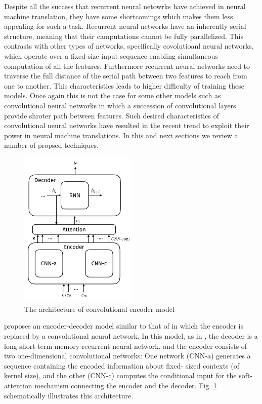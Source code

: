 \documentclass[a4paper]{article}
\begin{document}
Despite all the success that recurrent neural  netowrks  have achieved in neural
machine translation, they have some shortcomings which makes them less appealing
for such a task. Recurrent neural networks have an inherently serial  structure,
meaning that their  camputations  cannot  be  fully parallelized. This contrasts
with  other types of networks, specifically covolutioanl neural  networks, which
operate  over a  fixed-size input sequence enabling simultaneous computation  of
all the features. Furthermore  recurrent  neural networks need  to traverse  the
full distance of  the serial  path  between  two features  to reach from one  to
another. This characteristics  leads  to  higher  difficulty  of  training these
models. Once  again  this  is  not  the  case  for some  other  models  such  as
convolutional neural networks in  which  a succession  of  convolutional  layers
provide shroter  path  between features.  \cite{DBLP:journals/corr/GehringAGD16}
Such  desired characteristics  of convolutional neural networks have resulted in
the recent trend to exploit their power in neural machine  translations. In this
and next sections we review a number of propsed techniques.


\begin{figure}
  \center
  \includegraphics[width=0.5\textwidth]{img/CE}
  \caption{The architecture of convolutional encoder model}
  \label{fig:convenc}
\end{figure}


\citet{DBLP:journals/corr/GehringAGD16}   proposes   an   encoder-decoder  model
similar to that of \cite{bahdanau2014neural} in which the encoder is replaced by
a convolutional neural network. In this model, as  in \cite{bahdanau2014neural},
the  decoder is  a long  short-term memory recurrent  neural  network,  and  the
encoder  consists of  two one-dimensional convolutional  networks:  One  network
(CNN-a) generates  a  sequence containing  the encoded information about  fixed-
sized contexts (of kernel size), and the other (CNN-c) computes the  conditional
input for  the soft-attention mechanism  connecting the encoder and the decoder.
Fig. \ref{fig:convenc} schematically illustrates this architecture.
\end{document}
